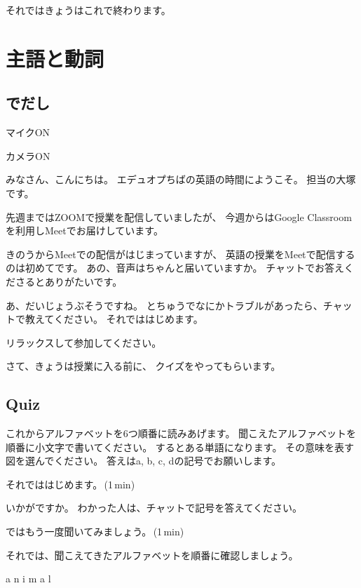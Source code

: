 \documentclass[book,jafontscale=0.9247]{jlreq}
\newenvironment{my_check}
  {\begin{itemize}
    \renewcommand\labelitemi{$\square\hspace{0.5em}$}} %
  {\end{itemize}}
\begin{document}
それではきょうはこれで終わります。
\newpage
\chapter{主語と動詞}

\section{でだし}

\begin{my_check}
\item マイクON
\item カメラON
\end{my_check}

{\LARGE \ComputerMouse}

みなさん、こんにちは。
エデュオプちばの英語の時間にようこそ。
担当の大塚です。

先週まではZOOMで授業を配信していましたが、
今週からはGoogle Classroomを利用しMeetでお届けしています。

きのうからMeetでの配信がはじまっていますが、
英語の授業をMeetで配信するのは初めてです。
あの、音声はちゃんと届いていますか。
チャットでお答えくださるとありがたいです。

あ、だいじょうぶそうですね。
とちゅうでなにかトラブルがあったら、チャットで教えてください。
それでははじめます。

リラックスして参加してください。

さて、きょうは授業に入る前に、
クイズをやってもらいます。

{\large \ComputerMouse}

\newpage
\section{Quiz}

これからアルファベットを6つ順番に読みあげます。
聞こえたアルファベットを順番に小文字で書いてください。
するとある単語になります。
その意味を表す図を選んでください。
答えはa, b, c, dの記号でお願いします。


それでははじめます。\faVolumeUp\,(1\,min)

いかがですか。
わかった人は、チャットで記号を答えてください。


ではもう一度聞いてみましょう。\faVolumeUp\,(1\,min)

それでは、聞こえてきたアルファベットを順番に確認しましょう。{\large \ComputerMouse}

a
{\large \ComputerMouse}
n
{\large \ComputerMouse}
i
{\large \ComputerMouse}
m
{\large \ComputerMouse}
a
{\large \ComputerMouse}
l
\end{document}
